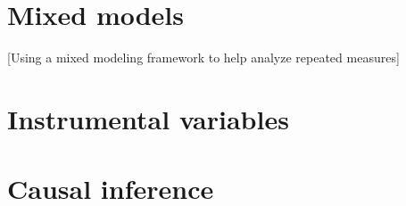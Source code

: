 \documentclass[
]{book}
\begin{document}
\hypertarget{mixed-models}{%
\chapter{Mixed models}\label{mixed-models}}

{[}Using a mixed modeling framework to help analyze repeated measures{]}

\hypertarget{instrumental-variables}{%
\chapter{Instrumental variables}\label{instrumental-variables}}

\hypertarget{causal-inference}{%
\chapter{Causal inference}\label{causal-inference}}

  
\end{document}
